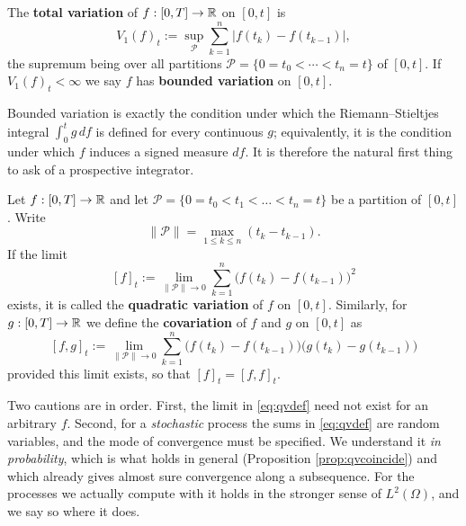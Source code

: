 \begin{definition}\label{def:totalvariation}
The \textbf{total variation} of $f : [0,T]\to\mathbb{R}$ on $[0,t]$ is
\begin{equation}
V_1(f)_t := \sup_{\mathcal{P}} \sum_{k=1}^n \bigl| f(t_k) - f(t_{k-1}) \bigr|,
\end{equation}
the supremum being over all partitions $\mathcal{P} = \{0=t_0<\cdots<t_n=t\}$ of $[0,t]$. If
$V_1(f)_t < \infty$ we say $f$ has \textbf{bounded variation} on $[0,t]$.
\end{definition}

Bounded variation is exactly the condition under which the Riemann--Stieltjes integral
$\int_0^t g\,df$ is defined for every continuous $g$; equivalently, it is the condition under
which $f$ induces a signed measure $df$. It is therefore the natural first thing to ask of a
prospective integrator.

\begin{definition} \label{def:quadratic-variation}
Let \(f : [0,T] \to \mathbb{R}\) and let \(\mathcal{P} = \{0=t_0 < t_1 < \dots < t_n=t\}\) be a partition of
\([0,t]\). Write
\begin{equation}
\lVert \mathcal{P} \rVert = \max_{1 \leq k \leq n} (t_k - t_{k-1}).
\end{equation}
If the limit
\begin{equation}\label{eq:qvdef}
[f]_t := \lim_{\lVert \mathcal{P} \rVert \to 0}
\sum_{k=1}^n \big( f(t_k) - f(t_{k-1}) \big)^2
\end{equation}
exists, it is called the \textbf{quadratic variation} of \(f\) on \([0,t]\). Similarly, for \(g : [0,T] \to \mathbb{R}\) we define the \textbf{covariation} of \(f\) and \(g\) on \([0,t]\) as
\begin{equation}\label{eq:covdef}
[f,g]_t := \lim_{\lVert \mathcal{P} \rVert \to 0}
\sum_{k=1}^n \big( f(t_k) - f(t_{k-1}) \big) \big( g(t_k) - g(t_{k-1}) \big)
\end{equation}
provided this limit exists, so that $[f]_t = [f,f]_t$.
\end{definition}

Two cautions are in order. First, the limit in \eqref{eq:qvdef} need not exist for an arbitrary $f$. Second, for a \emph{stochastic} process the sums in \eqref{eq:qvdef} are random variables, and the mode of convergence must be specified. We understand it \emph{in probability}, which is what holds in general (Proposition \ref{prop:qvcoincide}) and which already gives almost sure convergence along a subsequence. For the processes we actually compute with it holds in the stronger sense of $L^{2}(\Omega)$, and we say so where it does.

